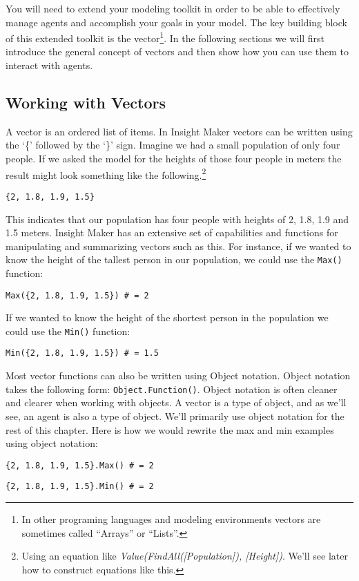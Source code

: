 \documentclass[]{memoir}
\begin{document}
You will need to extend your modeling toolkit in order to be able to
effectively manage agents and accomplish your goals in your model. The
key building block of this extended toolkit is the vector\footnote{In
  other programing languages and modeling environments vectors are
  sometimes called ``Arrays'' or ``Lists''.}. In the following sections
we will first introduce the general concept of vectors and then show how
you can use them to interact with agents.

\subsection{Working with Vectors}

A vector is an ordered list of items. In Insight Maker vectors can be
written using the `\{' followed by the `\}' sign. Imagine we had a small
population of only four people. If we asked the model for the heights of
those four people in meters the result might look something like the
following.\footnote{Using an equation like
  \emph{Value(FindAll({[}Population{]}), {[}Height{]})}. We'll see later
  how to construct equations like this.}

\lstinline!{2, 1.8, 1.9, 1.5}!

This indicates that our population has four people with heights of 2,
1.8, 1.9 and 1.5 meters. Insight Maker has an extensive set of
capabilities and functions for manipulating and summarizing vectors such
as this. For instance, if we wanted to know the height of the tallest
person in our population, we could use the \lstinline!Max()! function:

\lstinline!Max({2, 1.8, 1.9, 1.5}) # = 2!

If we wanted to know the height of the shortest person in the population
we could use the \lstinline!Min()! function:

\lstinline!Min({2, 1.8, 1.9, 1.5}) # = 1.5!

Most vector functions can also be written using Object notation. Object
notation takes the following form: \lstinline!Object.Function()!. Object
notation is often cleaner and clearer when working with objects. A
vector is a type of object, and as we'll see, an agent is also a type of
object. We'll primarily use object notation for the rest of this
chapter. Here is how we would rewrite the max and min examples using
object notation:

\lstinline!{2, 1.8, 1.9, 1.5}.Max() # = 2!

\lstinline!{2, 1.8, 1.9, 1.5}.Min() # = 2!
\end{document}

